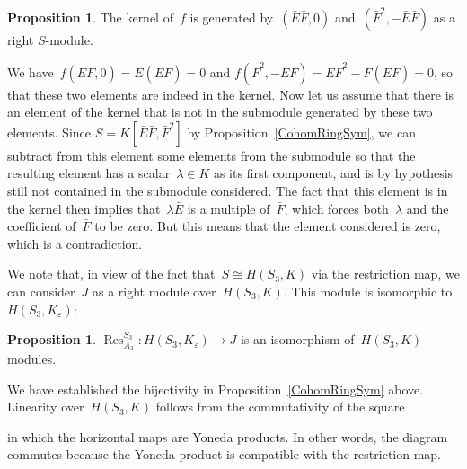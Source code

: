 \documentclass[12pt]{article}
\makeatletter
\theoremstyle{definition}
\newtheorem{Proposition}[Satz]{Proposition}
\theoremstyle{break}
\renewenvironment{proof}[1][\proofname]{\par
\vspace{-5pt}%
\pushQED{\qed}%
\normalfont
\topsep0pt \partopsep0pt %
\trivlist
\item[\hskip\labelsep
\bfseries
#1\@addpunct{.}]\ignorespaces
}{%
\popQED\endtrivlist\@endpefalse
\addvspace{6pt plus 6pt} %
}
\DeclareMathOperator\Res{Res}
\renewcommand{\1}{\mathbbm{1}}
\makeatother
\begin{document}
\begin{Proposition} \label{Kern}
The kernel of~$f$ is generated by~$(\bar{E} \bar{F},0)$ and~$(\bar{F}^2,-\bar{E} \bar{F})$ as a right \mbox{$S$-module}.
\end{Proposition}
\begin{proof}
We have~$f(\bar{E} \bar{F},0) = \bar{E} (\bar{E} \bar{F}) = 0$ and
$f(\bar{F}^2,-\bar{E} \bar{F}) = \bar{E} \bar{F}^2 - \bar{F} (\bar{E} \bar{F}) = 0$,
so that these two elements are indeed in the kernel. Now let us assume that there is an element of the kernel that is not in the submodule generated by these two elements.
Since $S = K[\bar{E} \bar{F}, \bar{F}^2]$ by Proposition~\ref{CohomRingSym}, we can subtract from this element some elements from the submodule so that the resulting element has a scalar~$\lambda \in K$ as its first component, and is by hypothesis still not contained in the submodule considered. The fact that this element is in the kernel then implies that~$\lambda \bar{E}$ is a multiple of~$\bar{F}$, which forces both~$\lambda$ and the coefficient of~$\bar{F}$ to be zero. But this means that the element considered is zero, which is a contradiction.
\end{proof}

\pagebreak

We note that, in view of the fact that~$S \cong H(S_3, K)$ via the restriction map, we can consider~$J$ as a right module over~$H(S_3, K)$. This module is isomorphic
to~$H(S_3, K_\varepsilon)$:
\begin{Proposition} \label{IsoMod}
$\Res^{S_3}_{A_3} \colon H(S_3, K_\varepsilon) \to J$ is an isomorphism of~$H(S_3, K)$-modules.
\end{Proposition}
\begin{proof}
We have established the bijectivity in Proposition~\ref{CohomRingSym} above. Linearity over~$H(S_3, K)$ follows from the commutativity of the square
\begin{center}
\end{center}
in which the horizontal maps are Yoneda products. In other words, the diagram commutes because the Yoneda product is compatible with the restriction map.
\end{proof}
\end{document}
